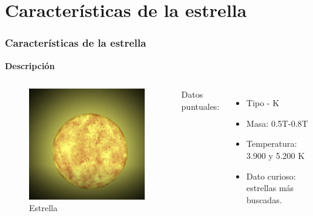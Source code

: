\documentclass[UKenglish]{beamer}
\begin{document}
\section{Características de la estrella}
\begin{frame}
\frametitle{Características de la estrella}{\textbf{Descripción}}

\begin{columns}

\begin{figure}[h!]
    \centering
    \includegraphics[scale=0.2]{Imagenes/9}
    \caption{Estrella}
    \label{fig:puntosdgs}
    \end{figure}

    Datos puntuales: 
    \begin{itemize}
        \item Tipo - K 
        \item Masa: 0.5T-0.8T
        \item Temperatura: 3.900 y 5.200 K
        \item Dato curioso: estrellas más buscadas. 
    \end{itemize}
    \end{columns}

\end{frame}
\end{document}
